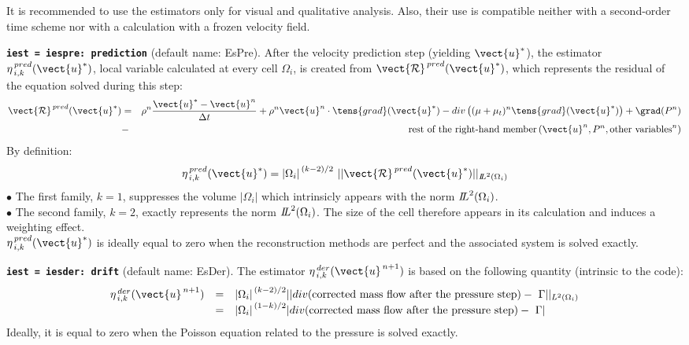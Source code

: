 It is recommended to use the estimators only for visual and qualitative
analysis. Also, their use is compatible neither with a second-order time scheme
nor with a calculation with a frozen velocity field.

{\tt \bf iest = iespre: prediction} (default name: EsPre).
After the velocity prediction step (yielding $\vect{u}^*$), the
estimator $\eta^{\,pred}_{\,i,k}(\vect{u}^*)$, local variable calculated
at every cell $\Omega_i$, is created from $\vect{\mathcal
R}^{\,pred}(\vect{u}^*)$, which represents the residual of the equation
solved during this step:
\begin{eqnarray*}
\vect{\mathcal R}^{\,pred}(\vect{u}^*)&= & \rho^n \frac{\vect{u}^*-\vect{u}^n}{\Delta t}
              + \rho^n \vect{u}^n \cdot \tens{grad}(\vect{u}^*)
              - div \left((\mu+\mu_t)^n \tens{grad}(\vect{u}^*) \right)
              + \grad(P^n)     \\
              &- &\text{rest of the right-hand member}
                        \,(\vect{u}^n, P^n, \text{other variables}^n)
\end{eqnarray*}
By definition:
$$ \eta^{\,pred}_{\,i,k}(\vect{u}^*)= {|\Omega_i|}^{\,(k-2)/2}\ ||\vect{\mathcal R}^{\,pred}(\vect{u}^*)||
_{{I\hspace{-.25em}L}^{2}(\Omega_i)}$$
\hspace*{0.5cm}$\bullet$ The first family, $k=1$, suppresses the
volume $|\Omega_i|$ which intrinsicly appears  with the norm
${{I\hspace{-.25em}L}^{2}(\Omega_i)}$.\\
\hspace*{0.5cm}$\bullet$ The second family, $k=2$, exactly represents the norm
${{I\hspace{-.25em}L}^{2}(\Omega_i)}$. The size of the cell therefore
appears in its calculation and induces a weighting effect.\\
$ \eta^{\,pred}_{\,i,k}(\vect{u}^*)$  is ideally equal to zero when the
reconstruction methods are perfect and the associated system is
solved exactly.

{\tt \bf iest = iesder: drift}  (default name: EsDer).
The estimator $\eta^{\,der}_{\,i,k}(\vect{u}^{\,n+1})$ is based on the
following quantity (intrinsic to the code):
\begin{equation}
\begin{array}{lll}
 \eta^{\,der}_{\,i,k}(\vect{u}^{\,n+1})
&=& {|\Omega_i|}^{\,(k-2)/2}
||div (\text{corrected mass flow after the pressure step})
                                              -\ \Gamma||_{{L}^{2}(\Omega_i)} \\
&=& {|\Omega_i|}^{\,(1-k)/2}
|div (\text{corrected mass flow after the pressure step})-\ \Gamma|
\end{array}
\end{equation}
Ideally, it is equal to zero when the Poisson equation related to the pressure is
solved exactly.


